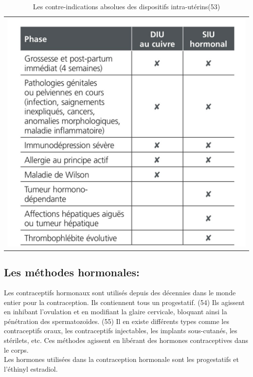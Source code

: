 \begin{table}[H]
  \centering
  \begin{tabular}{c}
      \includegraphics{Images/tab_1.jpg} \\
  \end{tabular}
  \caption{Les contre-indications absolues des dispositifs intra-utérins(53)}
\end{table}

\subsection{Les méthodes hormonales:}

\noindent Les contraceptifs hormonaux sont utilisés depuis des décennies dans le monde entier pour la contraception. Ils contiennent tous un progestatif. (54) Ils agissent en inhibant l’ovulation et en modifiant la glaire cervicale, bloquant ainsi la pénétration des spermatozoïdes. (55)  Il en existe différents types comme les contraceptifs oraux, les contraceptifs injectables, les implants sous-cutanés, les stérilets, etc. Ces méthodes agissent en libérant des hormones contraceptives dans le corps.\\  

\noindent Les hormones utilisées dans la contraception hormonale sont les progestatifs et l’éthinyl estradiol.\\

